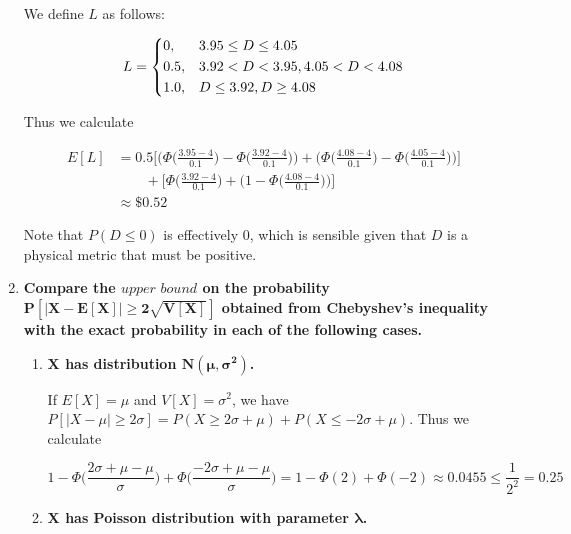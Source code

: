 \documentclass[10pt, oneside]{article}   	%
\theoremstyle{definition}
\begin{document}
\begin{enumerate}[label=9.\arabic*]
We define $L$ as follows:

\[ L = \begin{dcases}
0, & 3.95 \leq D \leq 4.05 \\
0.5, & 3.92 < D < 3.95, 4.05 < D < 4.08 \\
1.0, & D \leq 3.92, D \geq 4.08
\end{dcases}
\]

Thus we calculate

\begin{align*}
E[L] &= 0.5 \bigg[ \bigg( \Phi \bigg( \frac{3.95 - 4}{0.1} \bigg) - \Phi \bigg( \frac{3.92 - 4}{0.1} \bigg) \bigg) + \bigg( \Phi \bigg( \frac{4.08 - 4}{0.1} \bigg) - \Phi \bigg( \frac{4.05 - 4}{0.1} \bigg) \bigg) \bigg] \\
&\quad \quad + \bigg[ \Phi \bigg( \frac{3.92 - 4}{0.1} \bigg) + \bigg( 1 - \Phi \bigg( \frac{4.08 - 4}{0.1} \bigg) \bigg) \bigg] \\
&\approx \boxed{\$ 0.52}
\end{align*}

Note that $P(D \leq 0)$ is effectively 0, which is sensible given that $D$ is a physical metric that must be positive.

\item  \begin{tcolorbox}[
  colback=Cerulean!5!white,
  colframe=Cerulean!75!black]
\textbf{Compare the $\textit{upper bound}$ on the probability $\bm{P[|X - E[X]| \geq 2 \sqrt{V[X]}]}$ obtained from Chebyshev's inequality with the exact probability in each of the following cases.}
\end{tcolorbox}

	\begin{enumerate}
	\item  \begin{tcolorbox}[
	  colback=Cerulean!5!white,
	  colframe=Cerulean!75!black]
	\textbf{$\bm{X}$ has distribution $\bm{N(\mu, \sigma^2)}$.}
	\end{tcolorbox}
	
	If $E[X] = \mu$ and $V[X] = \sigma^2$, we have $P[|X - \mu| \geq 2 \sigma] = P(X \geq 2\sigma + \mu) + P(X \leq -2\sigma + \mu)$. Thus we calculate 
	
	\[ 1 - \Phi \bigg(\frac{2\sigma + \mu - \mu}{\sigma} \bigg) + \Phi \bigg( \frac{-2\sigma + \mu - \mu}{\sigma} \bigg) = 1 - \Phi(2) + \Phi(-2) \approx \boxed{0.0455} \leq \frac{1}{2^2} = 0.25 \]
	
	\item  \begin{tcolorbox}[
	  colback=Cerulean!5!white,
	  colframe=Cerulean!75!black]
	\textbf{$\bm{X}$ has Poisson distribution with parameter $\bm{\lambda}$.}
	\end{tcolorbox}
	

\end{enumerate}
\end{enumerate}
\end{document}

